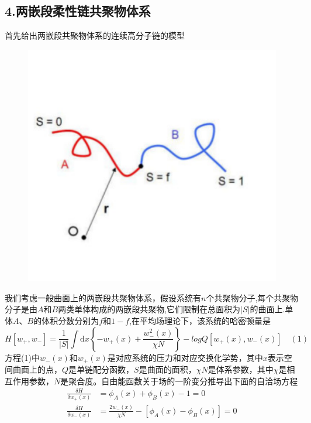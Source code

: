 \documentclass{article}
\begin{document}
\subsection{4.两嵌段柔性链共聚物体系}
首先给出两嵌段共聚物体系的连续高分子链的模型
\begin{figure}[H]
\centering
\includegraphics[scale=0.5]{./figures/dblock.pdf}
\caption{}
\end{figure}
我们考虑一般曲面上的两嵌段共聚物体系，假设系统有$n$个共聚物分子,每个共聚物分子是由$A$和$B$两类单体构成的两嵌段共聚物,它们限制在总面积为$\left|S\right|$的曲面上.单体$A$、$B$的体积分数分别为$f$和$1-f$,在平均场理论下，该系统的哈密顿量是
\begin{equation*}
H[w_+,w_-]=\frac{1}{\left|S\right|}\int\mathrm{d}x\left\{-w_+(x)+\frac{w_-^2(x)}{\chi N}\right\}-logQ[w_+(x),w_-(x)]\quad(1)
\end{equation*}
方程(1)中$w_-(x)$和$w_+(x)$是对应系统的压力和对应交换化学势，其中$x$表示空间曲面上的点，$Q$是单链配分函数，$S$是曲面的面积，$\chi N$是体系参数，其中$\chi$是相互作用参数，$N$是聚合度。自由能函数关于场的一阶变分推导出下面的自洽场方程
\begin{equation*}
\begin{aligned}
\frac{\delta H}{\delta w_+(x)}&=\phi_A(x)+\phi_B(x)-1=0\\
\frac{\delta H}{\delta w_-(x)}&=\frac{2w_-(x)}{\chi N}-[\phi_A(x)-\phi_B(x)]=0
\end{aligned}
\end{equation*}
\end{document}
